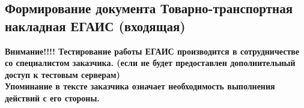 \subsection{Формирование документа Товарно-транспортная накладная ЕГАИС (входящая)}

\begin{warning}
    \textbf{Внимание!!!! Тестирование работы ЕГАИС производится в сотрудничестве со специалистом заказчика. (если не будет предоставлен дополнительный доступ к тестовым серверам) \\
        Упоминание в тексте заказчика означает необходимость выполнения действий с его стороны.}
\end{warning}



\renewcommand{\arraystretch}{1.8} %
